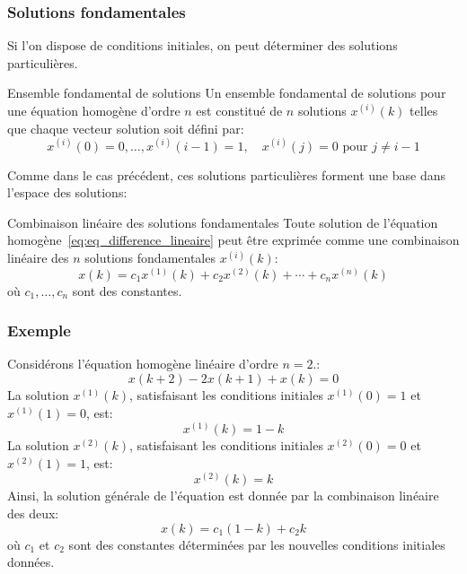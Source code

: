             \subsubsection{Solutions fondamentales}
                Si l'on dispose de conditions initiales, on peut déterminer des solutions particulières.
                \begin{definition}{Ensemble fondamental de solutions}
                    Un ensemble fondamental de solutions pour une équation homogène d'ordre $n$ est constitué de $n$ solutions $x^{(i)}(k)$ telles que chaque vecteur solution soit défini par:
                    \begin{equation}
                        x^{(i)}(0) = 0, \dots, x^{(i)}(i-1) = 1, \quad x^{(i)}(j) = 0 \text{ pour } j \neq i-1
                    \end{equation}
                \end{definition}
                Comme dans le cas précédent, ces solutions particulières forment une base dans l'espace des solutions:
                \begin{theorem}{Combinaison linéaire des solutions fondamentales}
                    Toute solution de l'équation homogène~\eqref{eq:eq_difference_lineaire} peut être exprimée comme une combinaison linéaire des $n$ solutions fondamentales $x^{(i)}(k)$:
                    \begin{equation}
                        x(k) = c_1 x^{(1)}(k)+c_2 x^{(2)}(k)+\cdots+c_n x^{(n)}(k)
                    \end{equation}
                    où $c_1, \dots, c_n$ sont des constantes.
                \end{theorem}
        
            \subsubsection{Exemple}
                Considérons l'équation homogène linéaire d'ordre $n=2$.:
                \begin{equation}
                    x(k+2)-2x(k+1)+x(k) = 0
                \end{equation}
                La solution $x^{(1)}(k)$, satisfaisant les conditions initiales $x^{(1)}(0) = 1$ et $x^{(1)}(1) = 0$, est:
                \begin{equation}
                    x^{(1)}(k) = 1-k
                \end{equation}
                La solution $x^{(2)}(k)$, satisfaisant les conditions initiales $x^{(2)}(0) = 0$ et $x^{(2)}(1) = 1$, est:
                \begin{equation}
                    x^{(2)}(k) = k
                \end{equation}
                Ainsi, la solution générale de l'équation est donnée par la combinaison linéaire des deux:
                \begin{equation}
                    x(k) = c_1 (1-k)+c_2 k
                \end{equation}
                où $c_1$ et $c_2$ sont des constantes déterminées par les nouvelles conditions initiales données.

